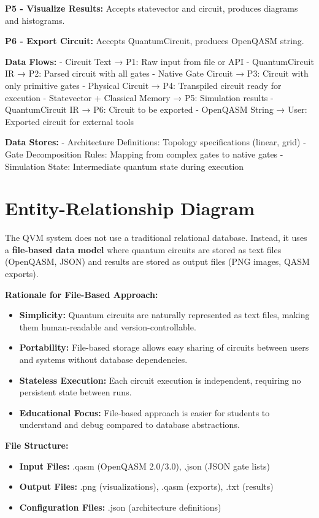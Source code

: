 \textbf{P5 - Visualize Results:} Accepts statevector and circuit, produces diagrams and histograms.

\textbf{P6 - Export Circuit:} Accepts QuantumCircuit, produces OpenQASM string.

\textbf{Data Flows:}
- Circuit Text → P1: Raw input from file or API
- QuantumCircuit IR → P2: Parsed circuit with all gates
- Native Gate Circuit → P3: Circuit with only primitive gates
- Physical Circuit → P4: Transpiled circuit ready for execution
- Statevector + Classical Memory → P5: Simulation results
- QuantumCircuit IR → P6: Circuit to be exported
- OpenQASM String → User: Exported circuit for external tools

\textbf{Data Stores:}
- Architecture Definitions: Topology specifications (linear, grid)
- Gate Decomposition Rules: Mapping from complex gates to native gates
- Simulation State: Intermediate quantum state during execution

\section{Entity-Relationship Diagram}
The QVM system does not use a traditional relational database. Instead, it uses a \textbf{file-based data model} where quantum circuits are stored as text files (OpenQASM, JSON) and results are stored as output files (PNG images, QASM exports).

\textbf{Rationale for File-Based Approach:}
\begin{itemize}
\item \textbf{Simplicity:} Quantum circuits are naturally represented as text files, making them human-readable and version-controllable.
\item \textbf{Portability:} File-based storage allows easy sharing of circuits between users and systems without database dependencies.
\item \textbf{Stateless Execution:} Each circuit execution is independent, requiring no persistent state between runs.
\item \textbf{Educational Focus:} File-based approach is easier for students to understand and debug compared to database abstractions.
\end{itemize}

\textbf{File Structure:}
\begin{itemize}
\item \textbf{Input Files:} .qasm (OpenQASM 2.0/3.0), .json (JSON gate lists)
\item \textbf{Output Files:} .png (visualizations), .qasm (exports), .txt (results)
\item \textbf{Configuration Files:} .json (architecture definitions)
\end{itemize}

